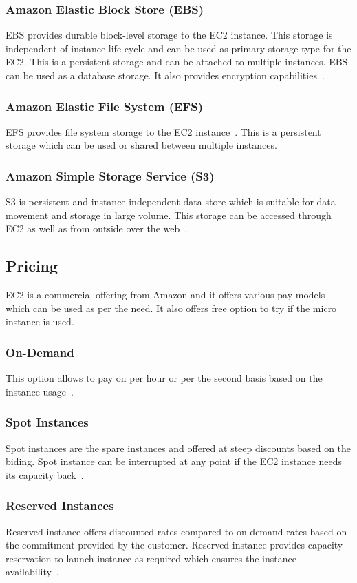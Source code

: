 \subsubsection{Amazon Elastic Block Store (EBS)} 
EBS provides durable block-level storage to the EC2 instance. This
storage is independent of instance life cycle and can be used as
primary storage type for the EC2. This is a persistent storage and can
be attached to multiple instances. EBS can be used as a database
storage. It also provides encryption
capabilities~\cite{hid-sp18-402-www-aws-ec2Storage}.
\subsubsection{Amazon Elastic File System (EFS)} 
EFS provides file system storage to the EC2
instance~\cite{hid-sp18-402-www-aws-ec2Storage}. This is a persistent
storage which can be used or shared between multiple instances.
\subsubsection{Amazon Simple Storage Service (S3)} 
S3 is persistent and instance independent data store which is suitable
for data movement and storage in large volume. This storage can be
accessed through EC2 as well as from outside over the
web~\cite{hid-sp18-402-www-aws-ec2Storage}.

\subsection{Pricing}
EC2 is a commercial offering from Amazon and it offers various pay
models which can be used as per the need. It also offers free option
to try if the micro instance is used.
\subsubsection{On-Demand} 
This option allows to pay on per hour or per the second basis based on
the instance usage~\cite{hid-sp18-402-www-aws-ec2Pricing}.
\subsubsection{Spot Instances} 
Spot instances are the spare instances and offered at steep discounts
based on the biding. Spot instance can be interrupted at any point if
the EC2 instance needs its capacity
back~\cite{hid-sp18-402-www-aws-ec2Pricing}.
\subsubsection{Reserved Instances} 
Reserved instance offers discounted rates compared to on-demand rates
based on the commitment provided by the customer. Reserved instance
provides capacity reservation to launch instance as required which
ensures the instance
availability~\cite{hid-sp18-402-www-aws-ec2Pricing}.
